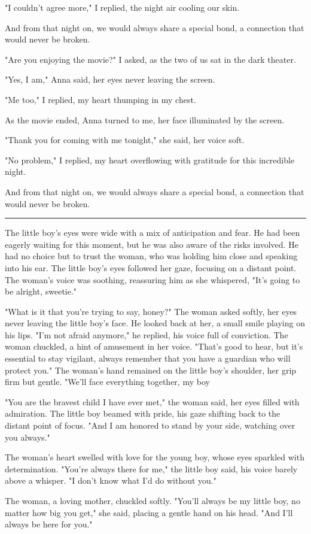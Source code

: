 \documentclass[smalldemyvopaper,11pt,twoside,onecolumn,openright,extrafontsizes]{memoir}
\begin{document}
"I couldn't agree more," I replied, the night air cooling our skin.\par
And from that night on, we would always share a special bond, a connection that would never be broken.\par
"Are you enjoying the movie?" I asked, as the two of us sat in the dark theater.\par
"Yes, I am," Anna said, her eyes never leaving the screen.\par
"Me too," I replied, my heart thumping in my chest.\par
As the movie ended, Anna turned to me, her face illuminated by the screen.\par
"Thank you for coming with me tonight," she said, her voice soft.\par
"No problem," I replied, my heart overflowing with gratitude for this incredible night.\par
And from that night on, we would always share a special bond, a connection that would never be broken.\par
\fancybreak{* * *}
The little boy's eyes were wide with a mix of anticipation and fear. He had been eagerly waiting for this moment, but he was also aware of the risks involved. He had no choice but to trust the woman, who was holding him close and speaking into his ear. The little boy's eyes followed her gaze, focusing on a distant point. The woman's voice was soothing, reassuring him as she whispered, "It's going to be alright, sweetie."\par
"What is it that you're trying to say, honey?" The woman asked softly, her eyes never leaving the little boy's face. He looked back at her, a small smile playing on his lips. "I'm not afraid anymore," he replied, his voice full of conviction. The woman chuckled, a hint of amusement in her voice. "That's good to hear, but it's essential to stay vigilant, always remember that you have a guardian who will protect you." The woman's hand remained on the little boy's shoulder, her grip firm but gentle. "We'll face everything together, my boy\par
"You are the bravest child I have ever met," the woman said, her eyes filled with admiration. The little boy beamed with pride, his gaze shifting back to the distant point of focus. "And I am honored to stand by your side, watching over you always."\par
The woman's heart swelled with love for the young boy, whose eyes sparkled with determination. "You're always there for me," the little boy said, his voice barely above a whisper. "I don't know what I'd do without you."\par
The woman, a loving mother, chuckled softly. "You'll always be my little boy, no matter how big you get," she said, placing a gentle hand on his head. "And I'll always be here for you."\par
\end{document}
